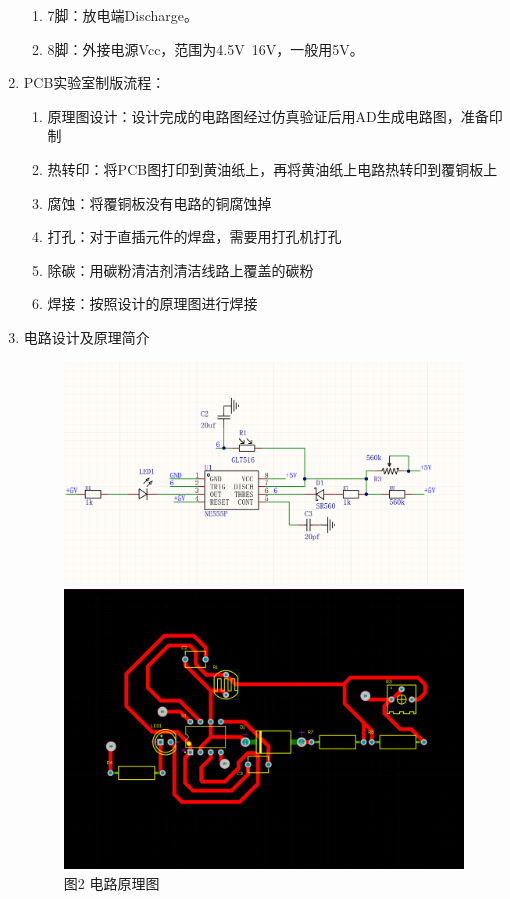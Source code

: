 \documentclass[a4paper,12pt]{article}
\begin{document}
\begin{enumerate}
\begin{enumerate}
			\item 7脚：放电端Discharge。
			\item 8脚：外接电源Vcc，范围为4.5V~16V，一般用5V。
		\end{enumerate}
		\item PCB实验室制版流程：\par 
		\begin{enumerate}
			\item 原理图设计：设计完成的电路图经过仿真验证后用AD生成电路图，准备印制
			\item 热转印：将PCB图打印到黄油纸上，再将黄油纸上电路热转印到覆铜板上
			\item 腐蚀：将覆铜板没有电路的铜腐蚀掉
			\item 打孔：对于直插元件的焊盘，需要用打孔机打孔
			\item 除碳：用碳粉清洁剂清洁线路上覆盖的碳粉
			\item 焊接：按照设计的原理图进行焊接
		\end{enumerate}	
		\item 电路设计及原理简介 \par
		\begin{figure}[h]
			\centering
			\begin{minipage}{0.5\textwidth}
				\includegraphics[width=\textwidth]{2.png}
				\caption*{图2 电路原理图}
			\end{minipage}
			\qquad
			\begin{minipage}{0.5\textwidth}
				\includegraphics[width=\textwidth]{3.png}

\end{minipage}
\end{figure}
\end{enumerate}
\end{document}
